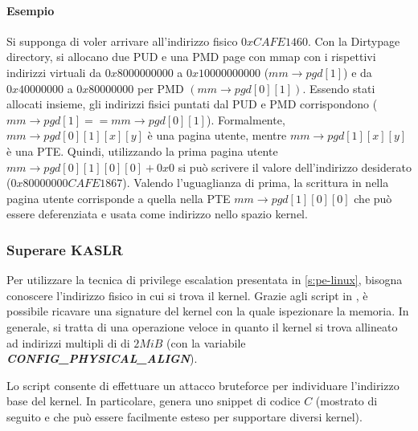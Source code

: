 \documentclass{article}
\begin{document}
\paragraph{Esempio}
Si supponga di voler arrivare all'indirizzo fisico $0xCAFE1460$. 
Con la Dirtypage directory, si allocano due PUD e una PMD page con mmap con i rispettivi 
indirizzi virtuali da $0x8000000000$ a $0x10000000000$ ($mm\to pgd[1]$) e da $0x40000000$ a
$0x80000000$ per PMD $(mm\to pgd[0][1])$. Essendo stati allocati insieme, 
gli indirizzi fisici puntati dal PUD e PMD corrispondono ($mm \to pgd[1] == mm \to pgd[0][1]$). 
Formalmente, $mm\to pgd[0][1][x][y]$ è una pagina utente, mentre $mm\to pgd[1][x][y]$ è una 
PTE. Quindi, utilizzando la prima pagina utente $mm\to pgd[0][1][0][0]+0x0$ si può 
scrivere il valore dell'indirizzo desiderato ($0x80000000CAFE1867$). Valendo l'uguaglianza di 
prima, la scrittura in nella pagina utente corrisponde a quella nella PTE 
$mm\to pgd[1][0][0]$ che può essere deferenziata e usata come indirizzo nello spazio kernel.

\subsubsection{Superare KASLR}
Per utilizzare la tecnica di privilege escalation presentata in \cref{s:pe-linux}, 
bisogna conoscere l'indirizzo fisico in cui si trova il kernel. Grazie agli script in 
\cite{KernelSig}, è possibile ricavare una signature del kernel con la quale ispezionare 
la memoria. In generale, si tratta di una operazione veloce in quanto il kernel si trova 
allineato ad indirizzi multipli di di $2MiB$ (con la variabile \textbf{\textit{CONFIG\_PHYSICAL\_ALIGN}}). 

Lo script consente di effettuare un attacco bruteforce per individuare l'indirizzo base del 
kernel. In particolare, genera uno snippet di codice $C$ (mostrato di seguito e che può
essere facilmente esteso per supportare diversi kernel). 
\end{document}
